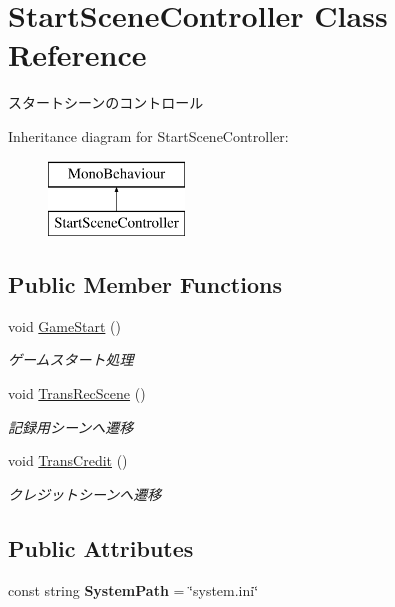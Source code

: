 \hypertarget{class_start_scene_controller}{}\section{Start\+Scene\+Controller Class Reference}
\label{class_start_scene_controller}


スタートシーンのコントロール  


Inheritance diagram for Start\+Scene\+Controller\+:\begin{figure}[H]
\begin{center}
\leavevmode
\includegraphics[height=2.000000cm]{class_start_scene_controller}
\end{center}
\end{figure}
\subsection*{Public Member Functions}
\begin{DoxyCompactItemize}
\item 
void \hyperlink{class_start_scene_controller_ac5e366920ae5020dc597d73cd37d46f6}{Game\+Start} ()
\begin{DoxyCompactList}\small\item\em ゲームスタート処理 \end{DoxyCompactList}\item 
void \hyperlink{class_start_scene_controller_a96e64473fe36f4f8886182f077ee0bee}{Trans\+Rec\+Scene} ()
\begin{DoxyCompactList}\small\item\em 記録用シーンへ遷移 \end{DoxyCompactList}\item 
void \hyperlink{class_start_scene_controller_a4fd8845ca6240575e271043b47921487}{Trans\+Credit} ()
\begin{DoxyCompactList}\small\item\em クレジットシーンへ遷移 \end{DoxyCompactList}\end{DoxyCompactItemize}
\subsection*{Public Attributes}
\begin{DoxyCompactItemize}
\item 
const string {\bfseries System\+Path} = \char`\"{}system.\+ini\char`\"{}\hypertarget{class_start_scene_controller_afb57c08c7d198676745f920203610558}{}\label{class_start_scene_controller_afb57c08c7d198676745f920203610558}

\end{DoxyCompactItemize}

